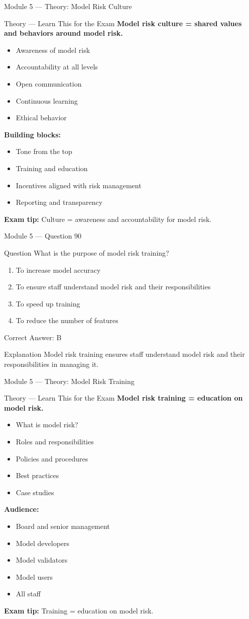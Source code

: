 \documentclass[aspectratio=169,10pt]{beamer}
\newcommand{\question}[1]{%
	\begin{block}{Question}
		#1
	\end{block}
}
\newcommand{\options}[4]{%
	\begin{enumerate}[label=\Alph*.,leftmargin=*]
		\item #1
		\item #2
		\item #3
		\item #4
	\end{enumerate}
}
\newcommand{\answerbox}[1]{%
	\begin{exampleblock}{Correct Answer: #1}
	\end{exampleblock}
}
\newcommand{\explain}[1]{%
	\begin{block}{Explanation}
		\small #1
	\end{block}
}
\newcommand{\theory}[1]{%
	\begin{block}{Theory --- Learn This for the Exam}
		\small #1
	\end{block}
}
\begin{document}
	\begin{frame}{Module 5 --- Theory: Model Risk Culture}
		\theory{
			\textbf{Model risk culture = shared values and behaviors around model risk.}
			\begin{itemize}
				\item Awareness of model risk
				\item Accountability at all levels
				\item Open communication
				\item Continuous learning
				\item Ethical behavior
			\end{itemize}
			\textbf{Building blocks:}
			\begin{itemize}
				\item Tone from the top
				\item Training and education
				\item Incentives aligned with risk management
				\item Reporting and transparency
			\end{itemize}
			\textbf{Exam tip:} Culture = awareness and accountability for model risk.
		}
	\end{frame}
	
	\begin{frame}{Module 5 --- Question 90}
		\question{What is the purpose of model risk training?}
		\options{To increase model accuracy}{To ensure staff understand model risk and their responsibilities}{To speed up training}{To reduce the number of features}
		\answerbox{B}
		\explain{Model risk training ensures staff understand model risk and their responsibilities in managing it.}
	\end{frame}
	
	\begin{frame}{Module 5 --- Theory: Model Risk Training}
		\theory{
			\textbf{Model risk training = education on model risk.}
			\begin{itemize}
				\item What is model risk?
				\item Roles and responsibilities
				\item Policies and procedures
				\item Best practices
				\item Case studies
			\end{itemize}
			\textbf{Audience:}
			\begin{itemize}
				\item Board and senior management
				\item Model developers
				\item Model validators
				\item Model users
				\item All staff
			\end{itemize}
			\textbf{Exam tip:} Training = education on model risk.
		}
	\end{frame}
	
\end{document}
